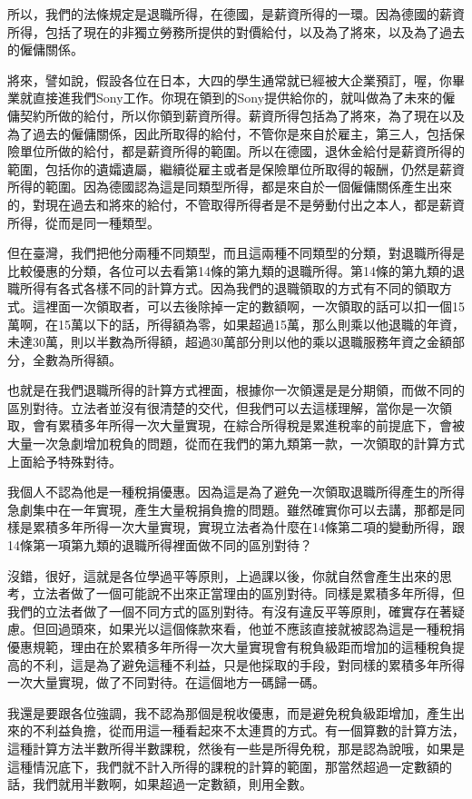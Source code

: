 \documentclass[]{ctexbook}
\begin{document}
所以，我們的法條規定是退職所得，在德國，是薪資所得的一環。因為德國的薪資所得，包括了現在的非獨立勞務所提供的對價給付，以及為了將來，以及為了過去的僱傭關係。

將來，譬如說，假設各位在日本，大四的學生通常就已經被大企業預訂，喔，你畢業就直接進我們Sony工作。你現在領到的Sony提供給你的，就叫做為了未來的僱傭契約所做的給付，所以你領到薪資所得。薪資所得包括為了將來，為了現在以及為了過去的僱傭關係，因此所取得的給付，不管你是來自於雇主，第三人，包括保險單位所做的給付，都是薪資所得的範圍。所以在德國，退休金給付是薪資所得的範圍，包括你的遺孀遺屬，繼續從雇主或者是保險單位所取得的報酬，仍然是薪資所得的範圍。因為德國認為這是同類型所得，都是來自於一個僱傭關係產生出來的，對現在過去和將來的給付，不管取得所得者是不是勞動付出之本人，都是薪資所得，從而是同一種類型。

但在臺灣，我們把他分兩種不同類型，而且這兩種不同類型的分類，對退職所得是比較優惠的分類，各位可以去看第14條的第九類的退職所得。第14條的第九類的退職所得有各式各樣不同的計算方式。因為我們的退職領取的方式有不同的領取方式。這裡面一次領取者，可以去後除掉一定的數額啊，一次領取的話可以扣一個15萬啊，在15萬以下的話，所得額為零，如果超過15萬，那么則乘以他退職的年資，未達30萬，則以半數為所得額，超過30萬部分則以他的乘以退職服務年資之金額部分，全數為所得額。

也就是在我們退職所得的計算方式裡面，根據你一次領還是是分期領，而做不同的區別對待。立法者並沒有很清楚的交代，但我們可以去這樣理解，當你是一次領取，會有累積多年所得一次大量實現，在綜合所得稅是累進稅率的前提底下，會被大量一次急劇增加稅負的問題，從而在我們的第九類第一款，一次領取的計算方式上面給予特殊對待。

我個人不認為他是一種稅捐優惠。因為這是為了避免一次領取退職所得產生的所得急劇集中在一年實現，產生大量稅捐負擔的問題。雖然確實你可以去講，那都是同樣是累積多年所得一次大量實現，實現立法者為什麼在14條第二項的變動所得，跟14條第一項第九類的退職所得裡面做不同的區別對待？

沒錯，很好，這就是各位學過平等原則，上過課以後，你就自然會產生出來的思考，立法者做了一個可能說不出來正當理由的區別對待。同樣是累積多年所得，但我們的立法者做了一個不同方式的區別對待。有沒有違反平等原則，確實存在著疑慮。但回過頭來，如果光以這個條款來看，他並不應該直接就被認為這是一種稅捐優惠規範，理由在於累積多年所得一次大量實現會有稅負級距而增加的這種稅負提高的不利，這是為了避免這種不利益，只是他採取的手段，對同樣的累積多年所得一次大量實現，做了不同對待。在這個地方一碼歸一碼。

我還是要跟各位強調，我不認為那個是稅收優惠，而是避免稅負級距增加，產生出來的不利益負擔，從而用這一種看起來不太連貫的方式。有一個算數的計算方法，這種計算方法半數所得半數課稅，然後有一些是所得免稅，那是認為說哦，如果是這種情況底下，我們就不計入所得的課稅的計算的範圍，那當然超過一定數額的話，我們就用半數啊，如果超過一定數額，則用全數。
\end{document}

